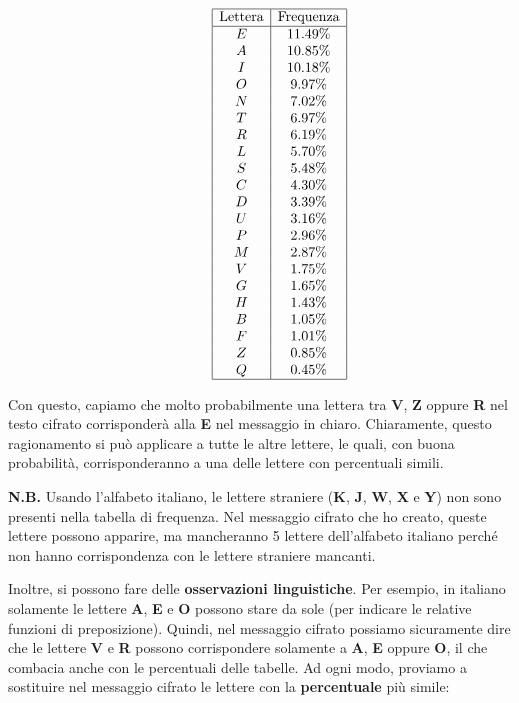 \documentclass{report}
\begin{document}
\[\begin{array}{c@{\hskip 1cm}c}
\begin{array}{|c|c|}
\hline
\end{array}
&
\begin{array}{|c|c|}
\hline
\text{Lettera} & \text{Frequenza} \\ \hline
E & 11.49\%  \\ 
A & 10.85\%  \\ 
I & 10.18\%  \\ 
O & 9.97\%  \\ 
N & 7.02\%  \\ 
T & 6.97\%  \\ 
R & 6.19\%  \\ 
L & 5.70\%  \\ 
S & 5.48\%  \\ 
C & 4.30\%  \\ 
D & 3.39\%  \\ 
U & 3.16\%  \\ 
P & 2.96\%  \\ 
M & 2.87\%  \\ 
V & 1.75\%  \\ 
G & 1.65\%  \\ 
H & 1.43\%  \\ 
B & 1.05\%  \\ 
F & 1.01\%  \\ 
Z & 0.85\%  \\ 
Q & 0.45\%  \\  
\hline
\end{array}
\end{array}
\]


Con questo, capiamo che molto probabilmente una lettera tra \textbf{V}, \textbf{Z} oppure \textbf{R} nel testo cifrato corrisponderà alla \textbf{E} nel messaggio in chiaro.  
Chiaramente, questo ragionamento si può applicare a tutte le altre lettere, le quali, con buona probabilità, corrisponderanno a una delle lettere con percentuali simili.


\textbf{N.B.} Usando l'alfabeto italiano, le lettere straniere (\textbf{K}, \textbf{J}, \textbf{W}, \textbf{X} e \textbf{Y}) non sono presenti nella tabella di frequenza.  
Nel messaggio cifrato che ho creato, queste lettere possono apparire, ma mancheranno 5 lettere dell'alfabeto italiano perché non hanno corrispondenza con le lettere straniere mancanti.


\newpage
Inoltre, si possono fare delle \textbf{osservazioni linguistiche}.  
Per esempio, in italiano solamente le lettere \textbf{A}, \textbf{E} e \textbf{O} possono stare da sole (per indicare le relative funzioni di preposizione).  
Quindi, nel messaggio cifrato possiamo sicuramente dire che le lettere \textbf{V} e \textbf{R} possono corrispondere solamente a \textbf{A}, \textbf{E} oppure \textbf{O}, il che combacia anche con le percentuali delle tabelle.  
Ad ogni modo, proviamo a sostituire nel messaggio cifrato le lettere con la \textbf{percentuale} più simile:
\end{document}
